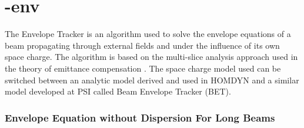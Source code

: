 \chapter{\opal-env}

The \opalenv Envelope Tracker is an algorithm used to solve the envelope equations
of a beam propagating through external fields and under the influence of its
own space charge. The algorithm is based on the multi-slice analysis approach
used in the theory of emittance compensation \cite{bib:JBong}. The space charge
model used can be switched between an analytic model derived and used in HOMDYN
\cite{bib:HOMY} and a similar model developed at PSI called Beam Envelope Tracker
(BET).

\subsection{Envelope Equation without Dispersion For Long Beams}

